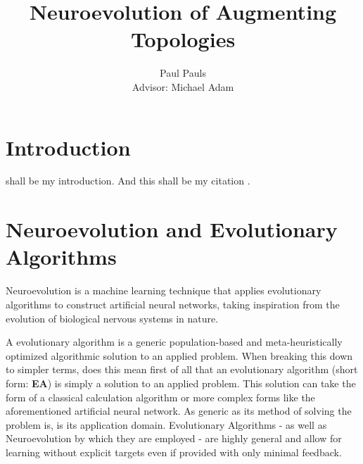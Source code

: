\documentclass[journal, a4paper]{IEEEtran}
\begin{document}
\title{Neuroevolution of Augmenting Topologies}
\author{Paul Pauls\\
        Advisor: Michael Adam}
\maketitle
  

\tableofcontents

\begin{abstract}
    \blindtext
\end{abstract}


\section{Introduction}

 shall be my introduction. And this shall be my citation \cite{cite01}.
\blindtext




\section{Neuroevolution and Evolutionary Algorithms}
Neuroevolution is a machine learning technique that applies evolutionary algorithms to construct artificial neural networks, taking inspiration from the evolution of biological nervous systems in nature. \cite{cite02}

A evolutionary algorithm is a generic population-based and meta-heuristically optimized algorithmic solution to an applied problem. When breaking this down to simpler terms, does this mean first of all that an evolutionary algorithm (short form: \textbf{EA}) is simply a solution to an applied problem. This solution can take the form of a classical calculation algorithm or more complex forms like the aforementioned artificial neural network. As generic as its method of solving the problem is, is its application domain. Evolutionary Algorithms - as well as Neuroevolution by which they are employed - are highly general and allow for learning without explicit targets even if provided with only minimal feedback. \cite{cite02}
\end{document}

